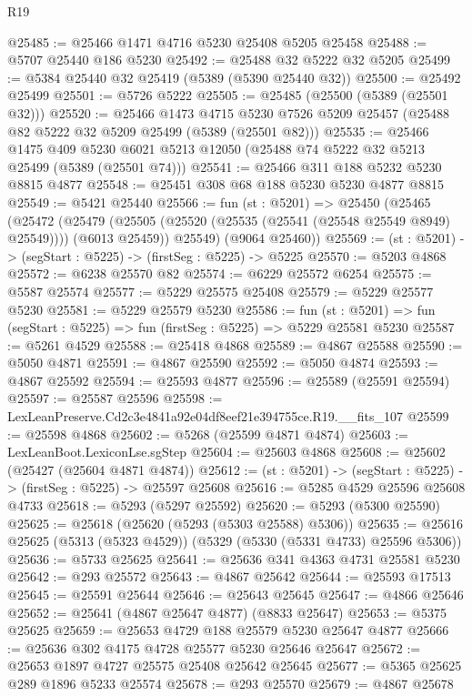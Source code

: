 \begin{lexlean}{R19}
\begin{coremodule}
@25485 := @25466 @1471 @4716 @5230 @25408 @5205 @25458
@25488 := @5707 @25440 @186 @5230
@25492 := @25488 @32 @5222 @32 @5205
@25499 := @5384 @25440 @32 @25419 (@5389 (@5390 @25440 @32))
@25500 := @25492 @25499
@25501 := @5726 @5222
@25505 := @25485 (@25500 (@5389 (@25501 @32)))
@25520 := @25466
    @1473
    @4715
    @5230
    @7526
    @5209
    @25457
    (@25488 @82 @5222 @32 @5209 @25499 (@5389 (@25501 @82)))
@25535 := @25466
    @1475
    @409
    @5230
    @6021
    @5213
    @12050
    (@25488 @74 @5222 @32 @5213 @25499 (@5389 (@25501 @74)))
@25541 := @25466 @311 @188 @5232 @5230 @8815 @4877
@25548 := @25451 @308 @68 @188 @5230 @5230 @4877 @8815
@25549 := @5421 @25440
@25566 := fun (st : @5201) =>
  @25450
    (@25465
      (@25472
        (@25479 (@25505 (@25520 (@25535 (@25541 (@25548 @25549 @8949) @25549)))) (@6013 @25459))
        @25549)
      (@9064 @25460))
@25569 := (st : @5201) -> (segStart : @5225) -> (firstSeg : @5225) -> @5225
@25570 := @5203 @4868
@25572 := @6238 @25570 @82
@25574 := @6229 @25572 @6254
@25575 := @5587 @25574
@25577 := @5229 @25575 @25408
@25579 := @5229 @25577 @5230
@25581 := @5229 @25579 @5230
@25586 := fun (st : @5201) => fun (segStart : @5225) => fun (firstSeg : @5225) => @5229 @25581 @5230
@25587 := @5261 @4529
@25588 := @25418 @4868
@25589 := @4867 @25588
@25590 := @5050 @4871
@25591 := @4867 @25590
@25592 := @5050 @4874
@25593 := @4867 @25592
@25594 := @25593 @4877
@25596 := @25589 (@25591 @25594)
@25597 := @25587 @25596
@25598 := LexLeanPreserve.Cd2c3e4841a92e04df8eef21e394755ce.R19.__fits_107
@25599 := @25598 @4868
@25602 := @5268 (@25599 @4871 @4874)
@25603 := LexLeanBoot.LexiconLse.sgStep
@25604 := @25603 @4868
@25608 := @25602 (@25427 (@25604 @4871 @4874))
@25612 := (st : @5201) -> (segStart : @5225) -> (firstSeg : @5225) -> @25597 @25608
@25616 := @5285 @4529 @25596 @25608 @4733
@25618 := @5293 (@5297 @25592)
@25620 := @5293 (@5300 @25590)
@25625 := @25618 (@25620 (@5293 (@5303 @25588) @5306))
@25635 := @25616 @25625 (@5313 (@5323 @4529)) (@5329 (@5330 (@5331 @4733) @25596 @5306))
@25636 := @5733 @25625
@25641 := @25636 @341 @4363 @4731 @25581 @5230
@25642 := @293 @25572
@25643 := @4867 @25642
@25644 := @25593 @17513
@25645 := @25591 @25644
@25646 := @25643 @25645
@25647 := @4866 @25646
@25652 := @25641 (@4867 @25647 @4877) (@8833 @25647)
@25653 := @5375 @25625
@25659 := @25653 @4729 @188 @25579 @5230 @25647 @4877
@25666 := @25636 @302 @4175 @4728 @25577 @5230 @25646 @25647
@25672 := @25653 @1897 @4727 @25575 @25408 @25642 @25645
@25677 := @5365 @25625 @289 @1896 @5233 @25574
@25678 := @293 @25570
@25679 := @4867 @25678

\end{coremodule}
\end{lexlean}
